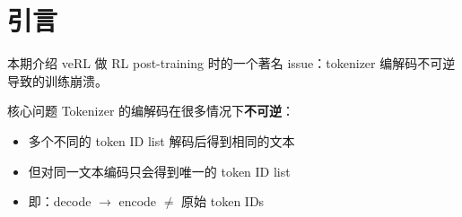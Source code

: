 \section{引言}
本期介绍 veRL 做 RL post-training 时的一个著名 issue：tokenizer 编解码不可逆导致的训练崩溃。

\begin{warningbox}{核心问题}
Tokenizer 的编解码在很多情况下\textbf{不可逆}：
\begin{itemize}
  \item 多个不同的 token ID list 解码后得到相同的文本
  \item 但对同一文本编码只会得到唯一的 token ID list
  \item 即：decode $\to$ encode $\neq$ 原始 token IDs
\end{itemize}
\end{warningbox}

